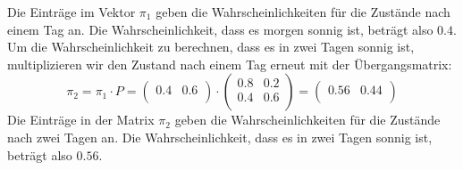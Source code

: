 \begin{myexample}
Die Einträge im Vektor $\pi_1$ geben die Wahrscheinlichkeiten für die Zustände nach einem Tag an. Die Wahrscheinlichkeit, dass es morgen sonnig ist, beträgt also $0.4$. Um die Wahrscheinlichkeit zu berechnen, dass es in zwei Tagen sonnig ist, multiplizieren wir den Zustand nach einem Tag erneut mit der Übergangsmatrix:
\[
    \pi_2 = \pi_1 \cdot P =
    \begin{pmatrix}
        0.4 & 0.6 \\
    \end{pmatrix}
    \cdot
    \begin{pmatrix}
        0.8 & 0.2 \\
        0.4 & 0.6 \\
    \end{pmatrix}
    =
    \begin{pmatrix}
        0.56 & 0.44 \\
    \end{pmatrix}
\]
Die Einträge in der Matrix $\pi_2$ geben die Wahrscheinlichkeiten für die Zustände nach zwei Tagen an. Die Wahrscheinlichkeit, dass es in zwei Tagen sonnig ist, beträgt also $0.56$.
\end{myexample}

